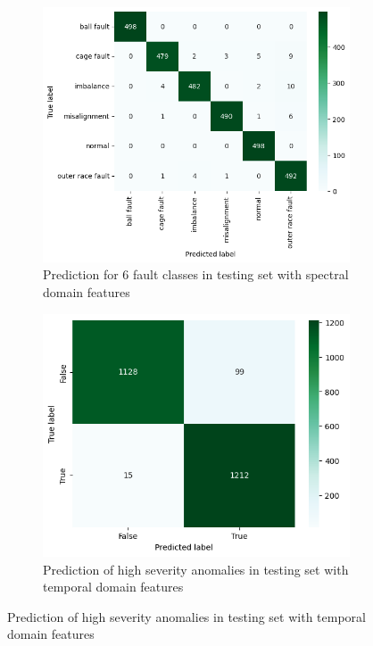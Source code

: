 \begin{figure}[ht]
\begin{subfigure}[b]{0.49\textwidth}
        \includegraphics[width=\textwidth]{assets/design/kNN-spectral-confusion-matrix-fault.png}
        \caption{Prediction for 6 fault classes in testing set with spectral domain features}
    \end{subfigure}
    \begin{subfigure}[b]{0.49\textwidth}
        \includegraphics[width=\textwidth]{assets/design/kNN-temporal-confusion-matrix-anomaly90.png}
        \caption{Prediction of high severity anomalies in testing set with temporal domain features}
    \end{subfigure}
    \hfill

\end{figure}
